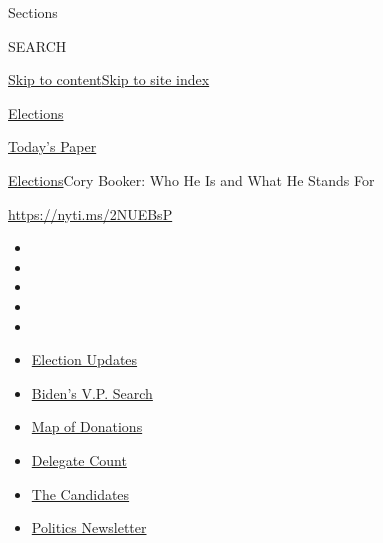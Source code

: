Sections

SEARCH

\protect\hyperlink{site-content}{Skip to
content}\protect\hyperlink{site-index}{Skip to site index}

\href{https://www.nytimes.com/news-event/2020-election}{Elections}

\href{https://myaccount.nytimes.com/auth/login?response_type=cookie\&client_id=vi}{}

\href{https://www.nytimes.com/section/todayspaper}{Today's Paper}

\href{/news-event/2020-election}{Elections}\textbar{}Cory Booker: Who He
Is and What He Stands For

\url{https://nyti.ms/2NUEBsP}

\begin{itemize}
\item
\item
\item
\item
\item
\end{itemize}

\begin{itemize}
\item
  \href{https://www.nytimes.com/2020/07/31/us/elections/biden-vs-trump.html?action=click\&pgtype=Article\&state=default\&region=TOP_BANNER\&context=storylines_menu}{Election
  Updates}
\item
  \href{https://www.nytimes.com/article/biden-vice-president-2020.html?action=click\&pgtype=Article\&state=default\&region=TOP_BANNER\&context=storylines_menu}{Biden's
  V.P. Search}
\item
  \href{https://www.nytimes.com/interactive/2020/07/24/us/politics/trump-biden-campaign-donors.html?action=click\&pgtype=Article\&state=default\&region=TOP_BANNER\&context=storylines_menu}{Map
  of Donations}
\item
  \href{https://www.nytimes.com/interactive/2020/us/elections/delegate-count-primary-results.html?action=click\&pgtype=Article\&state=default\&region=TOP_BANNER\&context=storylines_menu}{Delegate
  Count}
\item
  \href{https://www.nytimes.com/interactive/2019/us/politics/2020-presidential-candidates.html?action=click\&pgtype=Article\&state=default\&region=TOP_BANNER\&context=storylines_menu}{The
  Candidates}
\item
  \href{https://www.nytimes.com/newsletters/politics?action=click\&pgtype=Article\&state=default\&region=TOP_BANNER\&context=storylines_menu}{Politics
  Newsletter}
\end{itemize}

